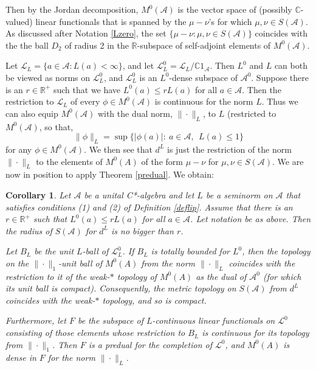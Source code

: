 \documentclass{amsart}[14pt]
\newtheorem{corollary}[theorem]{Corollary}
\theoremstyle{definition}
\theoremstyle{remark}
\newcommand{\cA}{{\mathcal A}}
\newcommand{\cL}{{\mathcal L}}
\newcommand{\bC}{{\mathbb C}}
\newcommand{\bR}{{\mathbb R}}
\newcommand{\<}{\langle}
\renewcommand{\>}{\rangle}
\numberwithin{equation}{section}
\begin{document}
{ Then by the Jordan decomposition,
$M^0(\cA)$ is the vector space of (possibly $\bC$-valued)
linear functionals that is spanned by the
$\mu - \nu$'s for which $\mu,\nu \in S(\cA)$.
As discussed after Notation \ref{Lzero}, 
the set $\{\mu - \nu: \mu, \nu \in S(\cA)\}$
coincides with the the ball $D_2$ of radius 2 in the
$\bR$-subspace of self-adjoint elements of $M^0(\cA)$.

Let $\cL_L = \{a \in \cA:L(a) < \infty\}$, and let
$\cL_L ^0 = \cL_L/\bC 1_\cA$. Then $L^0$ and $L$
can both be viewed as norms on $\cL_L ^0$, and $\cL_L ^0$
is an $L^0$-dense subspace of $\cA^0$.
Suppose there is an $r \in \bR^+$ such that we have
$L^0(a) \leq rL(a)$ for all $a \in \cA$. Then the restriction
to $\cL_L$ of every $\phi \in M^0(\cA)$ is continuous
for the norm $L$. Thus we can also equip $M^0(\cA)$ with the
dual norm, $\| \cdot \|_L $, to $L$ (restricted to $M^0(\cA)$, so that,
\begin{equation}
\label{ddnorm}
\|\phi\|_ L= \sup \{ |\phi(a)|: \  a \in \cA, \ \ L(a) \leq 1\}  
\end{equation}
for any $\phi \in M^0(\cA)$. 
We then see that $d^{L}$ is just the restriction of the norm
$\| \cdot \|_L $ to the elements of $M^0(A)$ of the form
$\mu - \nu$ for $\mu, \nu \in S(\cA)$. We are now in
position to apply Theorem \ref{predual}. We obtain:

\begin{corollary}
Let $\cA$ be a unital C*-algebra and let $L$ be a seminorm on
$\cA$ that satisfies conditions (1) and (2) of Definition \ref{deflip}.
Assume that  there is an $r \in \bR^+$ such that
$L^0(a) \leq rL(a)$ for all $a \in \cA$. Let notation be as
above. Then the radius of $S(\cA)$ for $d^L$ is no bigger than $r$. 

Let $B_L$ be the unit $L$-ball of $\cL_L^0$. If $B_L$ is totally 
bounded for $L^0$, then
the topology on the $\|\cdot\|_1$-unit ball of $M^0(A)$
 from the norm $\|\cdot\|_L$ coincides
with the restriction to it of the weak-$*$ topology of $M^0(A)$ as the
dual of $\cA^0$ (for which its unit ball is compact). Consequently,
the metric topology on $S(\cA)$ from $d^L$ coincides with
the weak-$*$ topology, and so is compact.

Furthermore, let $F$ be the subspace of $L$-continuous linear 
functionals on $\cL^0$ consisting
of those elements whose restriction to $B_L$ is continuous for
its topology from $\|\cdot \|_1$. Then $F$ is a predual for 
the completion of $\cL^0$, 
and $M^0(A)$ is  dense in $F$ for the norm $\|\cdot\|_L$.


\end{corollary}}
\end{document}
